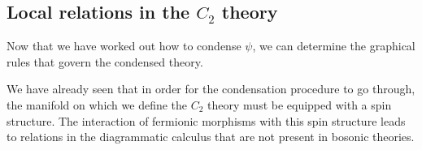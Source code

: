 \documentclass[12pt,a4paper]{article}
\newcommand{\PsiEnd}{\mathord{\vcenter{\hbox{\texttt{[image: PsiEnd.pdf]}}}}}
\newcommand{\PsiEndExchange}{\mathord{\vcenter{\hbox{\texttt{[image: PsiEndExchange.pdf]}}}}}
\begin{document}

 
 
\subsection{Local relations in the $C_2$ theory} \label{C2_local_relns}

Now that we have worked out how to condense $\psi$, we can determine the graphical rules that govern the condensed theory. 

We have already seen that in order for the condensation procedure to go through, 
the manifold on which we define the $C_2$ theory must be equipped with a spin structure. 
The interaction of fermionic morphisms with this spin structure leads to
relations in the diagrammatic calculus that are not present in bosonic theories.  
\end{document}
